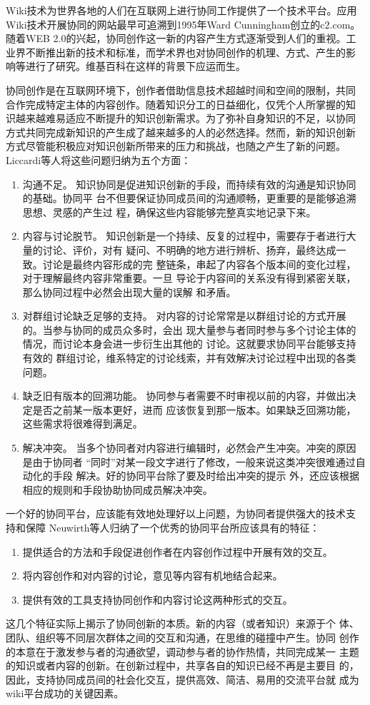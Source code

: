 Wiki技术为世界各地的人们在互联网上进行协同工作提供了一个技术平台。应用
Wiki技术开展协同的网站最早可追溯到1995年Ward Cunningham创立的c2.com。
随着WEB 2.0的兴起，协同创作这一新的内容产生方式逐渐受到人们的重视。工
业界不断推出新的技术和标准，而学术界也对协同创作的机理、方式、产生的影
响等进行了研究。维基百科在这样的背景下应运而生。

协同创作是在互联网环境下，创作者借助信息技术超越时间和空间的限制，共同
合作完成特定主体的内容创作。随着知识分工的日益细化，仅凭个人所掌握的知
识越来越难易适应不断提升的知识创新需求。为了弥补自身知识的不足，以协同
方式共同完成新知识的产生成了越来越多的人的必然选择。然而，新的知识创新
方式尽管能积极应对知识创新所带来的压力和挑战，也随之产生了新的问题。
Liccardi等人将这些问题归纳为五个方面\cite{liccardi2007caws}：
\begin{enumerate}
\item 沟通不足。
知识协同是促进知识创新的手段，而持续有效的沟通是知识协同的基础。协同平
台不但要保证协同成员间的沟通顺畅，更重要的是能够追溯思想、灵感的产生过
程，确保这些内容能够完整真实地记录下来。
\item 内容与讨论脱节。
知识创新是一个持续、反复的过程中，需要存于者进行大量的讨论、评价，对有
疑问、不明确的地方进行辨析、扬弃，最终达成一致。讨论是最终内容形成的完
整链条，串起了内容各个版本间的变化过程，对于理解最终内容非常重要。一旦
导论于内容间的关系没有得到紧密关联，那么协同过程中必然会出现大量的误解
和矛盾。
\item 对群组讨论缺乏足够的支持。
对内容的讨论常常是以群组讨论的方式开展的。当参与协同的成员众多时，会出
现大量参与者同时参与多个讨论主体的情况，而讨论本身会进一步衍生出其他的
讨论。这就要求协同平台能够支持有效的
群组讨论，维系特定的讨论线索，并有效解决讨论过程中出现的各类问题。
\item 缺乏旧有版本的回溯功能。
协同参与者需要不时审视以前的内容，并做出决定是否之前某一版本更好，进而
应该恢复到那一版本。如果缺乏回溯功能，这些需求将很难得到满足。
\item 解决冲突。
 当多个协同者对内容进行编辑时，必然会产生冲突。冲突的原因是由于协同者
 “同时”对某一段文字进行了修改，一般来说这类冲突很难通过自动化的手段
 解决。好的协同平台除了要及时给出冲突的提示
 外，还应该根据相应的规则和手段协助协同成员解决冲突。
\end{enumerate}

一个好的协同平台，应该能有效地处理好以上问题，为协同者提供强大的技术支
持和保障
Neuwirth等人归纳了一个优秀的协同平台所应该具有的特征：
\begin{enumerate}
\item 提供适合的方法和手段促进创作者在内容创作过程中开展有效的交互。
\item 将内容创作和对内容的讨论，意见等内容有机地结合起来。
\item 提供有效的工具支持协同创作和内容讨论这两种形式的交互。
\end{enumerate}
这几个特征实际上揭示了协同创新的本质。新的内容（或者知识）来源于个
体、团队、组织等不同层次群体之间的交互和沟通，在思维的碰撞中产生。协同
创作的本意在于激发参与者的沟通欲望，调动参与者的协作热情，共同完成某一
主题的知识或者内容的创新。在创新过程中，共享各自的知识已经不再是主要目
的，因此，支持协同成员间的社会化交互，提供高效、简洁、易用的交流平台就
成为wiki平台成功的关键因素。


